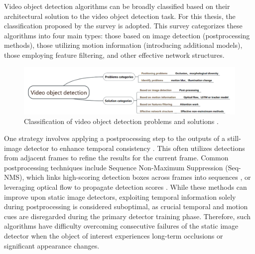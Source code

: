 
Video object detection algorithms can be broadly classified based on their architectural solution to the video object detection task. For this thesis, the classification proposed by the survey \cite{jiaoNewGenerationDeep2022} is adopted. This survey categorizes these algorithms into four main types: those based on image detection (postprocessing methods), those utilizing motion information (introducing additional models), those employing feature filtering, and other effective network structures.

\begin{figure}
    \centering
    \includegraphics[width=\textwidth]{figures/figure_background_vod_classification.png}
    \caption{Classification of video object detection problems and solutions \cite{jiaoNewGenerationDeep2022}.}
    \label{fig:figure_background_vod_classification}
\end{figure}

One strategy involves applying a postprocessing step to the outputs of a still-image detector to enhance temporal consistency \cite{hanSeqNMSVideoObject2016, kangTCNNTubeletsConvolutional2018, kangObjectDetectionVideo2016}. This often utilizes detections from adjacent frames to refine the results for the current frame. Common postprocessing techniques include Sequence Non-Maximum Suppression (Seq-NMS), which links high-scoring detection boxes across frames into sequences \cite{hanSeqNMSVideoObject2016}, or leveraging optical flow to propagate detection scores \cite{kangTCNNTubeletsConvolutional2018, kangObjectDetectionVideo2016}. While these methods can improve upon static image detectors, exploiting temporal information solely during postprocessing is considered suboptimal, as crucial temporal and motion cues are disregarded during the primary detector training phase. Therefore, such algorithms have difficulty overcoming consecutive failures of the static image detector when the object of interest experiences long-term occlusions or significant appearance changes.

